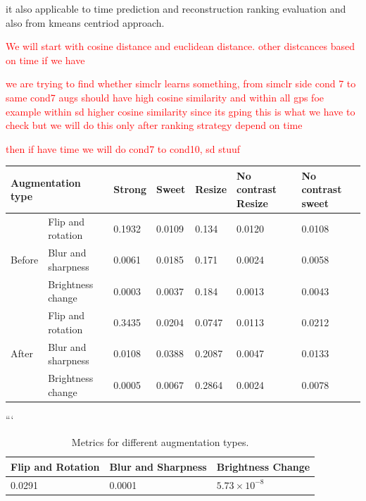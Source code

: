 it also applicable to time prediction and reconstruction ranking evaluation and also from kmeans centriod approach.


\textcolor{red}{We will start with cosine distance and euclidean distance. other distcances based on time if we have}


\textcolor{red}{we are trying to find whether simclr learns something, from simclr side cond 7 to same cond7 augs should have high cosine similarity and within all
 gps foe example within sd higher cosine similarity since its gping this is what we have to check but we will do this only after ranking strategy depend on time}


 \textcolor{red}{then if have time we will do cond7 to cond10, sd stuuf}

 \begin{table}
 \centering
 \begin{tabular}{ll*{5}{l}}
 \toprule
 \multicolumn{2}{l}{Augmentation type} & Strong & Sweet & Resize & No contrast Resize & No contrast sweet \\ 
 \midrule
 & Flip and rotation & 0.1932 & 0.0109 & 0.134 & 0.0120 & 0.0108 \\
 Before & Blur and sharpness & 0.0061 & 0.0185 & 0.171 & 0.0024 & 0.0058 \\
 & Brightness change & 0.0003 & 0.0037 & 0.184 & 0.0013 & 0.0043 \\
 \midrule
 & Flip and rotation & 0.3435 & 0.0204 & 0.0747 & 0.0113 & 0.0212 \\
 After & Blur and sharpness & 0.0108 & 0.0388 & 0.2087 & 0.0047 & 0.0133 \\
 & Brightness change & 0.0005 & 0.0067 & 0.2864 & 0.0024 & 0.0078 \\
 \bottomrule
 \end{tabular}
 \end{table}
 ```
    

 \begin{table}[H]
    \centering
    \begin{tabular}{@{}lll@{}}
    \toprule
    \textbf{Flip and Rotation} & \textbf{Blur and Sharpness} & \textbf{Brightness Change} \\ \midrule
    0.0291                     & 0.0001                     & $5.73 \times 10^{-8}$      \\ \bottomrule
    \end{tabular}
    \caption{Metrics for different augmentation types.}
    \label{tab:augmentation_metrics}
\end{table}
    



  